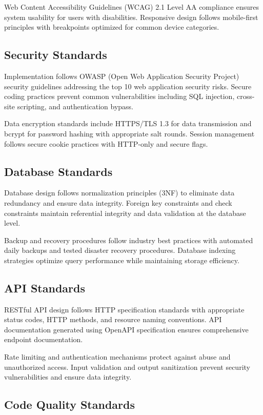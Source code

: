 \documentclass[12pt,a4paper]{report}
\begin{document}
Web Content Accessibility Guidelines (WCAG) 2.1 Level AA compliance ensures system usability for users with disabilities. Responsive design follows mobile-first principles with breakpoints optimized for common device categories.

\subsection{Security Standards}

Implementation follows OWASP (Open Web Application Security Project) security guidelines addressing the top 10 web application security risks. Secure coding practices prevent common vulnerabilities including SQL injection, cross-site scripting, and authentication bypass.

Data encryption standards include HTTPS/TLS 1.3 for data transmission and bcrypt for password hashing with appropriate salt rounds. Session management follows secure cookie practices with HTTP-only and secure flags.

\subsection{Database Standards}

Database design follows normalization principles (3NF) to eliminate data redundancy and ensure data integrity. Foreign key constraints and check constraints maintain referential integrity and data validation at the database level.

Backup and recovery procedures follow industry best practices with automated daily backups and tested disaster recovery procedures. Database indexing strategies optimize query performance while maintaining storage efficiency.

\subsection{API Standards}

RESTful API design follows HTTP specification standards with appropriate status codes, HTTP methods, and resource naming conventions. API documentation generated using OpenAPI specification ensures comprehensive endpoint documentation.

Rate limiting and authentication mechanisms protect against abuse and unauthorized access. Input validation and output sanitization prevent security vulnerabilities and ensure data integrity.

\subsection{Code Quality Standards}
\end{document}
